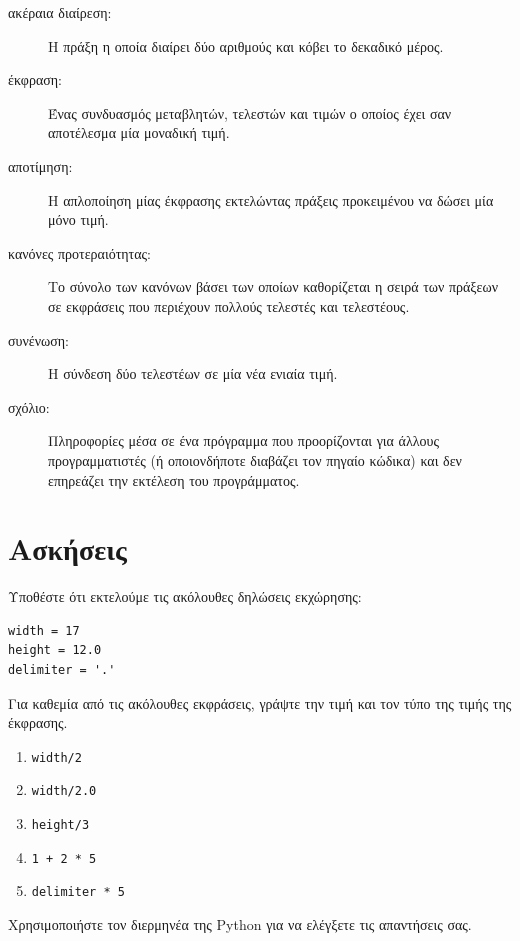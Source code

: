 \documentclass[10pt]{book}
\begin{document}
\begin{description}
\item[ακέραια διαίρεση:] Η πράξη η οποία διαίρει δύο αριθμούς και κόβει
	το δεκαδικό μέρος.

\item[έκφραση:] Ένας συνδυασμός μεταβλητών, τελεστών και τιμών ο οποίος
	έχει σαν αποτέλεσμα μία μοναδική τιμή.

\item[αποτίμηση:] Η απλοποίηση μίας έκφρασης εκτελώντας πράξεις προκειμένου
	να δώσει μία μόνο τιμή.

\item[κανόνες προτεραιότητας:] Το σύνολο των κανόνων βάσει των οποίων
    καθορίζεται	η σειρά των πράξεων σε εκφράσεις που περιέχουν πολλούς τελεστές
    και τελεστέους.

\item[συνένωση:] Η σύνδεση δύο τελεστέων σε μία νέα ενιαία τιμή.

\item[σχόλιο:] Πληροφορίες μέσα σε ένα πρόγραμμα που προορίζονται για άλλους
	προγραμματιστές (ή οποιονδήποτε διαβάζει τον πηγαίο κώδικα) και δεν
    επηρεάζει την εκτέλεση του προγράμματος.

\end{description}


\section{Ασκήσεις}


\begin{exercise}
Υποθέστε ότι εκτελούμε τις ακόλουθες δηλώσεις εκχώρησης:


\begin{verbatim}
width = 17
height = 12.0
delimiter = '.'
\end{verbatim}

Για καθεμία από τις ακόλουθες εκφράσεις, γράψτε την τιμή και τον
τύπο της τιμής της έκφρασης.


\begin{enumerate}

\item {\tt width/2}

\item {\tt width/2.0}

\item {\tt height/3}

\item {\tt 1 + 2 * 5}

\item {\tt delimiter * 5}

\end{enumerate}

Χρησιμοποιήστε τον διερμηνέα της Python για να ελέγξετε
τις απαντήσεις σας.\\
\end{exercise}
\end{document}
